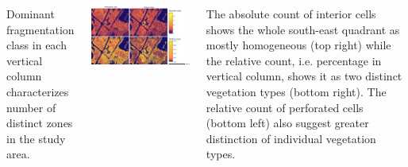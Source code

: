 \documentclass[25pt, margin=0mm, innermargin=15mm, blockverticalspace=15mm, colspace=15mm, subcolspace=8mm]{tikzposter}
\newcommand{\blocktitlewrap}[1]{\textsf{\textbf{\huge#1}}}
\begin{document}
\begin{columns}
{\vspace{-0.8ex}

Dominant fragmentation class in each vertical column characterizes
number of distinct zones in the study area.

\vspace{1.4ex}

\begin{center}
\includegraphics[width=\linewidth]{counts_all}
\end{center}

\vspace{-0.8ex}

The absolute count of interior cells shows
the whole south-east quadrant as mostly homogeneous (top right)
while the relative count, i.e. percentage in vertical column, shows it as two distinct
vegetation types (bottom right).
The relative count of perforated cells (bottom left) also suggest
greater distinction of individual vegetation types.

}


\block{\blocktitlewrap{Open Science}}{


\renewcommand{\labelitemi}{\textcolor{gray}{$\bullet$}\hspace{0.5ex}}

}
\end{columns}
\end{document}
